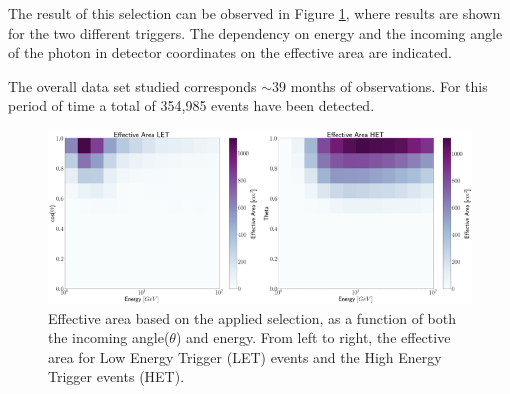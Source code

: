 \documentclass{PoS}
\begin{document}
The  result of this  selection can be observed in Figure \ref{eff_area}, where results are shown for the two different triggers. The dependency on energy and the incoming angle  of the photon in detector coordinates on the effective area are indicated.

The overall data set studied corresponds  $\sim 39$ months of observations. For  this period of time a total of  354,985 events have been detected. %









\begin{figure}
  \includegraphics[scale=0.65]{effective_Area.png}
  \caption{Effective area based on the applied selection, as a function of both the incoming angle($\theta$) and energy. From left to right, the effective area for Low Energy Trigger (LET) events and the High Energy Trigger events (HET). }
  \label{eff_area}
\end{figure}
\end{document}
